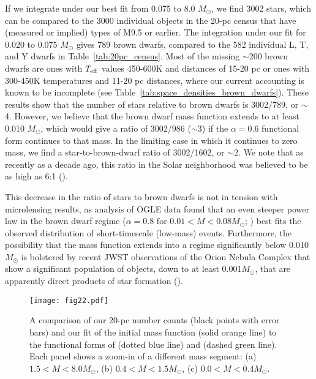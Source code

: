 \documentclass[twocolumn,tighten,twocolappendix]{aastex631}
\begin{document}
If we integrate under our best fit from 0.075 to 8.0 $M_\odot$, we find 3002 stars, which can be compared to the 3000 individual objects in the 20-pc census that have (measured or implied) types of M9.5 or earlier. The integration under our fit for 0.020 to 0.075 $M_\odot$ gives 789 brown dwarfs, compared to the 582 individual L, T, and Y dwarfs in Table~\ref{tab:20pc_census}. Most of the missing $\sim200$ brown dwarfs are ones with $T_{\rm eff}$ values 450-600K and distances of 15-20 pc or ones with 300-450K temperatures and 11-20 pc distances, where our current accounting is known to be incomplete (see Table~\ref{tab:space_densities_brown_dwarfs}). These results show that the number of stars relative to brown dwarfs is 3002/789, or $\sim$4. However, we believe that the brown dwarf mass function extends to at least 0.010 $M_\odot$, which would give a ratio of 3002/986 ($\sim$3) if the $\alpha = 0.6$ functional form continues to that mass. In the limiting case in which it continues to zero mass, we find a star-to-brown-dwarf ratio of 3002/1602, or $\sim2$. We note that as recently as a decade ago, this ratio in the Solar neighborhood was believed to be as high as 6:1 (\citealt{kirkpatrick2012}).

This decrease in the ratio of stars to brown dwarfs is not in tension with microlensing results, as analysis of OGLE data found that an even steeper power law in the brown dwarf regime ($\alpha = 0.8$ for $0.01 < M < 0.08 M_\odot$; \citealt{mroz2017}) best fits the observed distribution of short-timescale (low-mass) events. Furthermore, the possibility that the mass function extends into a regime significantly below 0.010 $M_\odot$ is bolstered by recent JWST observations of the Orion Nebula Complex that show a significant population of objects, down to at least 0.001$M_\odot$, that are apparently direct products of star formation (\citealt{mccaughrean2023,pearson2023}).

\begin{figure*}
\texttt{[image: fig22.pdf]}
\caption{A comparison of our 20-pc number counts (black points with error bars) and our fit of the initial mass function (solid orange line) to the functional forms of \cite{kroupa2013} (dotted blue line) and \cite{chabrier2003b} (dashed green line). Each panel shows a zoom-in of a different mass segment: (a) $1.5 < M < 8.0 M_\odot$, (b) $0.4 < M < 1.5 M_\odot$, (c) $0.0 < M < 0.4 M_\odot$.
\label{fig:full_initial_mass_function_comparison}}
\end{figure*}
\end{document}
